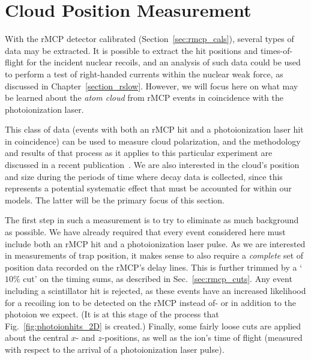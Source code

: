 \section{Cloud Position Measurement}
\label{sec:cloud_calibration}
With the \ac{rMCP} detector calibrated (Section~\ref{sec:rmcp_cals}), several types of data may be extracted.  It is possible to extract the hit positions and times-of-flight for the incident nuclear recoils, and an analysis of such data could be used to perform a test of right-handed currents within the nuclear weak force, as discussed in Chapter~\ref{section_rslow}.  However, we will focus here on what may be learned about the \emph{atom cloud} from rMCP events in coincidence with the photoionization laser.~  

This class of data (events with both an \ac{rMCP} hit and a photoionization laser hit in coincidence) can be used to measure cloud polarization, and the methodology and results of that process as it applies to this particular experiment are discussed in a recent publication~\cite{ben_OP}.  We are also interested in the cloud's position and size during the periods of time where decay data is collected, since this represents a potential systematic effect that must be accounted for within our models.  The latter will be the primary focus of this section.  

The first step in such a measurement is to try to eliminate as much background as possible.  We have already required that every event considered here must include both an rMCP hit and a photoionization laser pulse.  As we are interested in measurements of trap position, it makes sense to also require a \emph{complete} set of position data recorded on the \ac{rMCP}'s delay lines.   This is further trimmed by a `$10\%$ cut' on the timing sums, as described in Sec.~\ref{sec:rmcp_cuts}.  Any event including a scintillator hit is rejected, as these events have an increased likelihood for a recoiling ion to be detected on the rMCP instead of- or in addition to the photoion we expect. (It is at this stage of the process that Fig.~\ref{fig:photoionhits_2D} is created.)  Finally, some fairly loose cuts are applied about the central $x$- and $z$-positions, as well as the ion's time of flight (measured with respect to the arrival of a photoionization laser pulse).

